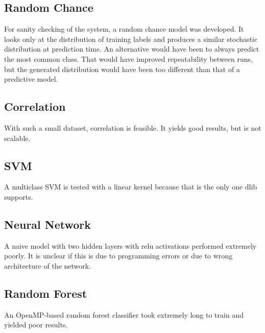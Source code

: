 \documentclass{article}
\begin{document}
\subsection{Random Chance}
For sanity checking of the system, a random chance model was developed.
It looks only at the distribution of training labels and produces a similar stochastic distribution at prediction time.
An alternative would have been to always predict the most common class.
That would have improved repeatability between runs, but the generated distribution would have been too different than that of a predictive model.


\subsection{Correlation}
With such a small dataset, correlation is feasible.
It yields good results, but is not scalable.


\subsection{SVM}
A multiclass SVM is tested with a linear kernel because that is the only one dlib\cite{dlib} supports.



\subsection{Neural Network}
A naive model with two hidden layers with relu activations performed extremely poorly.
It is unclear if this is due to programming errors or due to wrong architecture of the network.


\subsection{Random Forest}
An OpenMP-based random forest classifier took extremely long to train and yielded poor results.
\end{document}

